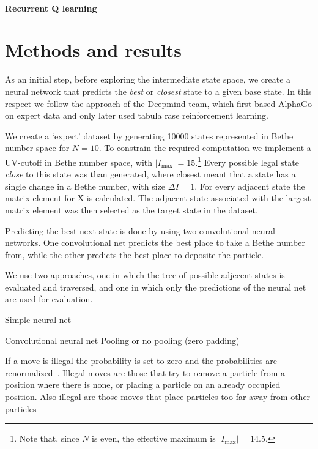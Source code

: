 \documentclass[11pt, a4paper]{report} %
\begin{document}
\subsubsection{Recurrent Q learning}

\chapter{Methods and results}\label{chap:results}



As an initial step, before exploring the intermediate state space, we create a neural network that predicts the \textit{best} or \textit{closest} state to a given base state.
In this respect we follow the approach of the Deepmind team, which first based AlphaGo on expert data and only later used tabula rase reinforcement learning.

We create a `expert' dataset by generating 10000 states represented in Bethe number space for $N=10$.
To constrain the required computation we implement a UV-cutoff in Bethe number space, with $\lvert I_{\max}\rvert=15$.\footnote{Note that, since $N$ is even, the effective maximum is $\lvert I_{\max}\rvert=14.5$.}
Every possible legal state \textit{close} to this state was than generated, where closest meant that a state has a single change in a Bethe number, with size $\Delta I = 1$.
For every adjacent state the matrix element for X is calculated.
The adjacent state associated with the largest matrix element was then selected as the target state in the dataset.

Predicting the best next state is done by using two convolutional neural networks. 
One convolutional net predicts the best place to take a Bethe number from, while the other predicts the best place to deposite the particle.


We use two approaches, one in which the tree of possible adjecent states is evaluated and traversed, and one in which only the predictions of the neural net are used for evaluation.

Simple neural net


Convolutional neural net
Pooling or no pooling (zero padding) 


If a move is illegal the probability is set to zero and the probabilities are renormalized~\cite{pmlr-v37-clark15}.
Illegal moves are those that try to remove a particle from a position where there is none, or placing a particle on an already occupied position.
Also illegal are those moves that place particles too far away from other particles 
\end{document}
